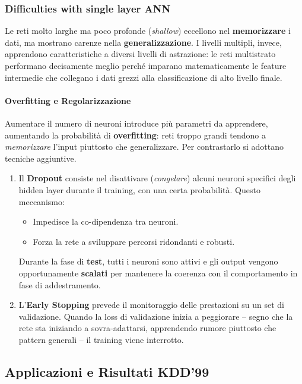 \subsubsection{Difficulties with single layer ANN}

Le reti molto larghe ma poco profonde (\textit{shallow}) eccellono nel
\textbf{memorizzare} i dati, ma mostrano carenze nella
\textbf{generalizzazione}. I livelli multipli, invece, apprendono
caratteristiche a diversi livelli di astrazione: le reti multistrato
performano decisamente meglio perché imparano matematicamente le
feature intermedie che collegano i dati grezzi alla classificazione di
alto livello finale.

\paragraph{Overfitting e Regolarizzazione}
Aumentare il numero di neuroni introduce più parametri da apprendere,
aumentando la probabilità di \textbf{overfitting}: reti troppo grandi
tendono a \textit{memorizzare} l'input piuttosto che generalizzare. Per
contrastarlo si adottano tecniche aggiuntive.

\begin{enumerate}
    \item Il \textbf{Dropout} consiste nel disattivare (\textit{congelare})
alcuni neuroni specifici degli hidden layer durante il training, con una
certa probabilità. Questo meccanismo:
\begin{itemize}
    \item Impedisce la co-dipendenza tra neuroni.
    \item Forza la rete a sviluppare percorsi ridondanti e robusti.
\end{itemize}
Durante la fase di \textbf{test}, tutti i neuroni sono attivi e gli
output vengono opportunamente \textbf{scalati} per mantenere la
coerenza con il comportamento in fase di addestramento.

    \item L'\textbf{Early Stopping} prevede il monitoraggio delle prestazioni su
un set di validazione. Quando la loss di validazione inizia a
peggiorare -- segno che la rete sta iniziando a sovra-adattarsi,
apprendendo rumore piuttosto che pattern generali -- il training viene
interrotto.
\end{enumerate}

\subsection{Applicazioni e Risultati KDD'99}

